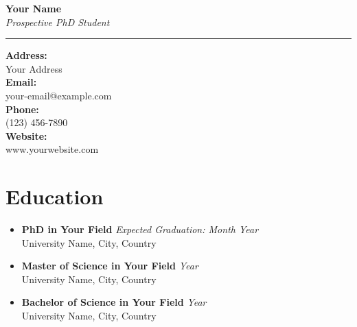 \documentclass[11pt,a4paper]{article}
\makeatletter
\newcommand{\name}{Your Name}
\newcommand{\titletext}{Prospective PhD Student}
\newcommand{\address}{Your Address}
\newcommand{\email}{your-email@example.com}
\newcommand{\phone}{(123) 456-7890}
\newcommand{\website}{www.yourwebsite.com}
\makeatother
\begin{document}
\begin{minipage}[t]{0.7\textwidth}
    \vspace{-\baselineskip}
    \color{accentcolor}\Huge{\textbf{\name}}\vspace{-0.3em}\\
    \textit{\titletext}\vspace{-0.7em}\\
    \rule{\textwidth}{0.8pt}
\end{minipage}%
\begin{minipage}[t]{0.3\textwidth}
    \vspace{-\baselineskip}
    \raggedleft
    \small{\textbf{Address:}}\\
    \address\vspace{0.2em}\\
    \small{\textbf{Email:}}\\
    \email\vspace{0.2em}\\
    \small{\textbf{Phone:}}\\
    \phone\vspace{0.2em}\\
    \small{\textbf{Website:}}\\
    \website\vspace{0.2em}
\end{minipage}

\section{Education}
\begin{itemize}
    \item[] \textbf{PhD in Your Field} \hfill \textit{Expected Graduation: Month Year}\\
    University Name, City, Country
    
    \item[] \textbf{Master of Science in Your Field} \hfill \textit{Year}\\
    University Name, City, Country
    
    \item[] \textbf{Bachelor of Science in Your Field} \hfill \textit{Year}\\
    University Name, City, Country
\end{itemize}

\end{document}
